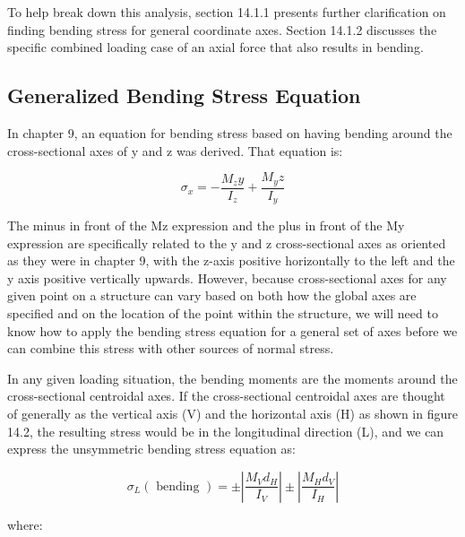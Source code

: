 \documentclass[
  letterpaper,
  DIV=11,
  numbers=noendperiod]{scrreprt}
\begin{document}
To help break down this analysis, section 14.1.1 presents further
clarification on finding bending stress for general coordinate axes.
Section 14.1.2 discusses the specific combined loading case of an axial
force that also results in bending.

\subsection{Generalized Bending Stress
Equation}\label{generalized-bending-stress-equation}

In chapter 9, an equation for bending stress based on having bending
around the cross-sectional axes of y and z was derived. That equation
is:

\[
\sigma_x=-\frac{M_z y}{I_z}+\frac{M_y z}{I_y}
\]

The minus in front of the Mz expression and the plus in front of the My
expression are specifically related to the y and z cross-sectional axes
as oriented as they were in chapter 9, with the z-axis positive
horizontally to the left and the y axis positive vertically upwards.
However, because cross-sectional axes for any given point on a structure
can vary based on both how the global axes are specified and on the
location of the point within the structure, we will need to know how to
apply the bending stress equation for a general set of axes before we
can combine this stress with other sources of normal stress.

In any given loading situation, the bending moments are the moments
around the cross-sectional centroidal axes. If the cross-sectional
centroidal axes are thought of generally as the vertical axis (V) and
the horizontal axis (H) as shown in figure 14.2, the resulting stress
would be in the longitudinal direction (L), and we can express the
unsymmetric bending stress equation as:

\[
\sigma_L(\text { bending })= \pm\left|\frac{M_V d_H}{I_V}\right| \pm\left|\frac{M_H d_V}{I_H}\right|
\]

where:
\end{document}
